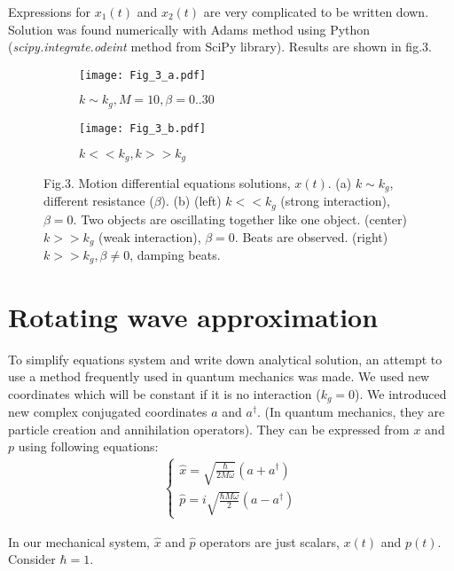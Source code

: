\documentclass[]{article}
\begin{document}
Expressions for $x_1(t)$ and $x_2(t)$ are very complicated to be written down. Solution was found numerically with Adams method using Python (\textit{scipy.integrate.odeint} method from SciPy library). Results are shown in fig.3.
\begin{figure}
	\begin{subfigure}{0.5\textheight}
		\texttt{[image: Fig\_3\_a.pdf]}
		\caption{$k \sim k_g, M=10, \beta = 0..30$}
	\end{subfigure}
	\begin{subfigure}{0.5\textheight}
		\texttt{[image: Fig\_3\_b.pdf]}
		\caption{$k<<k_g, k>>k_g$}
	\end{subfigure}
	\caption{\centering Fig.3. Motion differential equations solutions, $x(t)$. (a) $k \sim k_g$, different resistance ($\beta$). (b) (left) $k<<k_g$ (strong interaction), $\beta=0$. Two objects are oscillating together like one object. (center) $k>>k_g$ (weak interaction), $\beta=0$. Beats are observed. (right) $k>>k_g, \beta \ne 0$, damping beats.}
\end{figure}
\section{Rotating wave approximation}

To simplify equations system and write down analytical solution, an attempt to use a method frequently used in quantum mechanics was made. We used new coordinates which will be constant if it is no interaction ($k_g=0$).
\newline We introduced new complex conjugated coordinates $a$ and $a^\dag$. (In quantum mechanics, they are particle creation and annihilation operators). They can be expressed from $x$ and $p$ using following equations:
\begin{align*}
	\begin{cases}
		\hat{x} = \sqrt{\frac{\hbar}{2M\omega}}\left(a+a^\dag\right)
		\\
		\hat{p} = i\sqrt{\frac{\hbar M \omega}{2}}\left(a-a^\dag\right)
	\end{cases}	
\end{align*}

In our mechanical system, $\hat{x}$ and $\hat{p}$  operators are just scalars, $x(t)$ and $p(t)$. Consider $\hbar=1$.\newline
\end{document}
